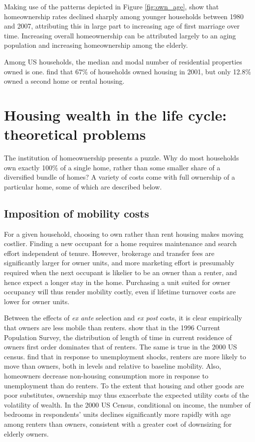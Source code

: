 \documentclass[12pt]{article}
\begin{document}
Making use of the patterns depicted in Figure \ref{fig:own_age},
\citet{FisherGervais} show that homeownership rates declined sharply among
younger households between 1980 and 2007, attributing this in large part to
increasing age of first marriage over time.  Increasing overall homeownership
can be attributed largely to an aging population and increasing homeownership
among the elderly.  

Among US households, the median and modal number of residential properties owned
is one.  \citet{AizcorbeKennickellMoore} find that 67\% of households owned
housing in 2001, but only 12.8\% owned a second home or rental housing.  

\section{Housing wealth in the life cycle: theoretical problems}

The institution of homeownership presents a puzzle.  Why do most households own
exactly 100\% of a single home, rather than some smaller share of a diversified
bundle of homes?  A variety of costs come with full ownership of a particular
home, some of which are described below.  

\subsection{Imposition of mobility costs}

For a given household, choosing to own rather than rent housing makes moving
costlier.  Finding a new occupant for a home requires maintenance and search
effort independent of tenure.  However, brokerage and transfer fees are
significantly larger for owner units, and more marketing effort is presumably
required when the next occupant is likelier to be an owner than a renter, and
hence expect a longer stay in the home.  Purchasing a unit suited for owner
occupancy will thus render mobility costly, even if lifetime turnover costs are
lower for owner units.

Between the effects of \emph{ex ante} selection and  \emph{ex post} costs, it is
clear empirically that owners are less mobile than renters.
\citet{SchachterKuenzi} show that in the 1996 Current Population Survey, the
distribution of length of time in current residence of owners first order
dominates that of renters.  The same is true in the 2000 US census.
\citet{ChettySzeidlra} find that in response to unemployment shocks, renters are
more likely to move than owners, both in levels and relative to baseline
mobility.  Also, homeowners decrease non-housing consumption more in response to
unemployment than do renters.  To the extent that housing and other goods are
poor substitutes, ownership may thus exacerbate the expected utility costs of
the volatility of wealth.  In the 2000 US Census, conditional on income, the
number of bedrooms in respondents' units declines significantly more rapidly
with age among renters than owners, consistent with a greater cost of downsizing
for elderly owners.
\end{document}
